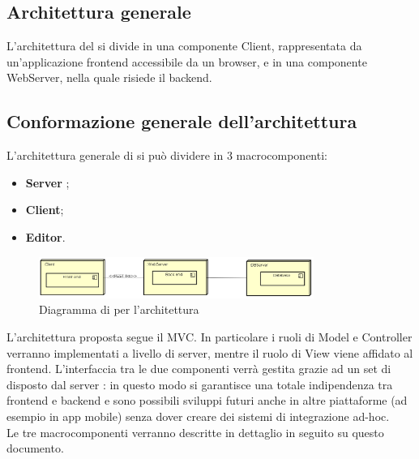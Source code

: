 \subsection{Architettura generale}
L'architettura del  si divide in una componente Client, rappresentata da un'applicazione frontend accessibile da un browser, e in una componente WebServer, nella quale risiede il backend. 

\subsection{Conformazione generale dell'architettura}
L'architettura generale di  si può dividere in 3 macrocomponenti:
\begin{itemize}
\item \textbf{Server }; 
\item \textbf{Client}; 
\item \textbf{Editor}.
\end{itemize}
\begin{figure}[h]
\centering
\includegraphics[width=0.8\textwidth]{res/sections/GeneralArchitecture.png}
\caption{Diagramma di  per l'architettura}
\end{figure}
L'architettura proposta segue il  MVC. In particolare i ruoli di Model e Controller verranno implementati a livello di server, mentre il ruolo di View viene affidato al frontend. L'interfaccia tra le due componenti verrà gestita grazie ad un set di  disposto dal server : in questo modo si garantisce una totale indipendenza tra frontend e backend e sono possibili sviluppi futuri anche in altre piattaforme (ad esempio in app mobile) senza dover creare dei sistemi di integrazione ad-hoc. \\
Le tre macrocomponenti verranno descritte in dettaglio in seguito su questo documento.
